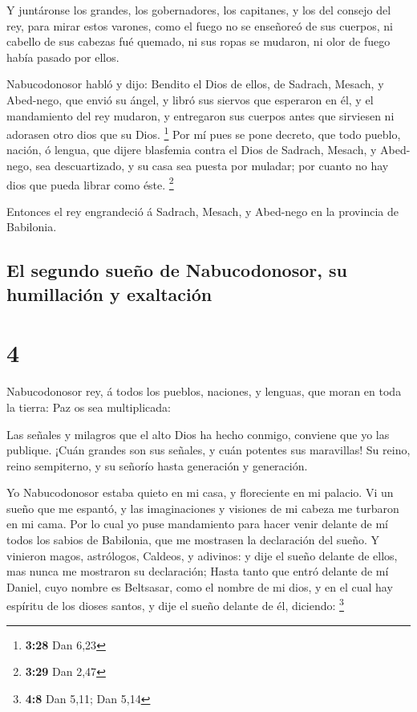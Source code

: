  Y juntáronse los grandes, los gobernadores, los capitanes,
y los del consejo del rey, para mirar estos varones, como el fuego no se
enseñoreó de sus cuerpos, ni cabello de sus cabezas fué quemado, ni sus
ropas se mudaron, ni olor de fuego había pasado por ellos.

 Nabucodonosor habló y dijo: Bendito el Dios de ellos, de
Sadrach, Mesach, y Abed-nego, que envió su ángel, y libró sus siervos
que esperaron en él, y el mandamiento del rey mudaron, y entregaron sus
cuerpos antes que sirviesen ni adorasen otro dios que su Dios.
\footnote{\textbf{3:28} Dan 6,23}  Por mí pues se pone
decreto, que todo pueblo, nación, ó lengua, que dijere blasfemia contra
el Dios de Sadrach, Mesach, y Abed-nego, sea descuartizado, y su casa
sea puesta por muladar; por cuanto no hay dios que pueda librar como
éste. \footnote{\textbf{3:29} Dan 2,47}

 Entonces el rey engrandeció á Sadrach, Mesach, y Abed-nego
en la provincia de Babilonia.

\hypertarget{el-segundo-sueuxf1o-de-nabucodonosor-su-humillaciuxf3n-y-exaltaciuxf3n}{%
\subsection{El segundo sueño de Nabucodonosor, su humillación y
exaltación}\label{el-segundo-sueuxf1o-de-nabucodonosor-su-humillaciuxf3n-y-exaltaciuxf3n}}

\hypertarget{section-3}{%
\section{4}\label{section-3}}

 Nabucodonosor rey, á todos los pueblos, naciones, y
lenguas, que moran en toda la tierra: Paz os sea multiplicada:

 Las señales y milagros que el alto Dios ha hecho conmigo,
conviene que yo las publique.  ¡Cuán grandes son sus
señales, y cuán potentes sus maravillas! Su reino, reino sempiterno, y
su señorío hasta generación y generación.

 Yo Nabucodonosor estaba quieto en mi casa, y floreciente en
mi palacio.  Vi un sueño que me espantó, y las imaginaciones
y visiones de mi cabeza me turbaron en mi cama.  Por lo cual
yo puse mandamiento para hacer venir delante de mí todos los sabios de
Babilonia, que me mostrasen la declaración del sueño.  Y
vinieron magos, astrólogos, Caldeos, y adivinos: y dije el sueño delante
de ellos, mas nunca me mostraron su declaración;  Hasta
tanto que entró delante de mí Daniel, cuyo nombre es Beltsasar, como el
nombre de mi dios, y en el cual hay espíritu de los dioses santos, y
dije el sueño delante de él, diciendo: \footnote{\textbf{4:8} Dan 5,11;
  Dan 5,14}

